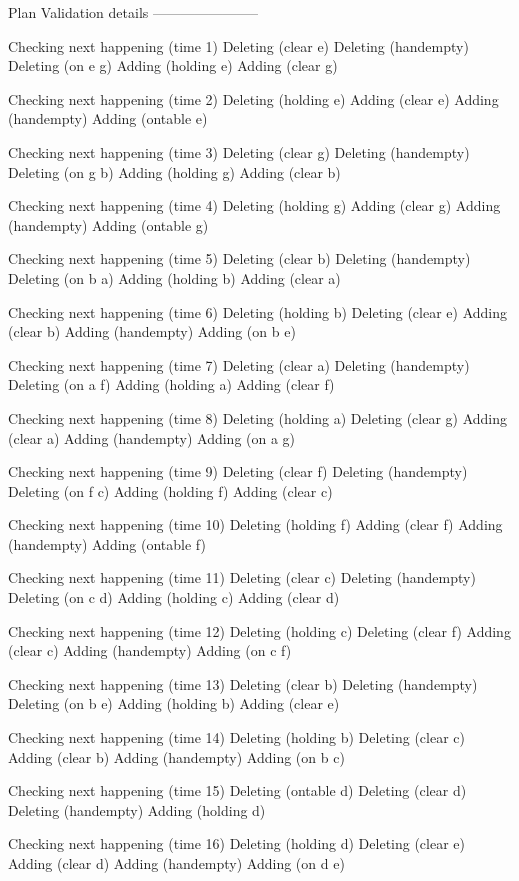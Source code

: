 Plan Validation details
-----------------------

Checking next happening (time 1)
Deleting (clear e)
Deleting (handempty)
Deleting (on e g)
Adding (holding e)
Adding (clear g)

Checking next happening (time 2)
Deleting (holding e)
Adding (clear e)
Adding (handempty)
Adding (ontable e)

Checking next happening (time 3)
Deleting (clear g)
Deleting (handempty)
Deleting (on g b)
Adding (holding g)
Adding (clear b)

Checking next happening (time 4)
Deleting (holding g)
Adding (clear g)
Adding (handempty)
Adding (ontable g)

Checking next happening (time 5)
Deleting (clear b)
Deleting (handempty)
Deleting (on b a)
Adding (holding b)
Adding (clear a)

Checking next happening (time 6)
Deleting (holding b)
Deleting (clear e)
Adding (clear b)
Adding (handempty)
Adding (on b e)

Checking next happening (time 7)
Deleting (clear a)
Deleting (handempty)
Deleting (on a f)
Adding (holding a)
Adding (clear f)

Checking next happening (time 8)
Deleting (holding a)
Deleting (clear g)
Adding (clear a)
Adding (handempty)
Adding (on a g)

Checking next happening (time 9)
Deleting (clear f)
Deleting (handempty)
Deleting (on f c)
Adding (holding f)
Adding (clear c)

Checking next happening (time 10)
Deleting (holding f)
Adding (clear f)
Adding (handempty)
Adding (ontable f)

Checking next happening (time 11)
Deleting (clear c)
Deleting (handempty)
Deleting (on c d)
Adding (holding c)
Adding (clear d)

Checking next happening (time 12)
Deleting (holding c)
Deleting (clear f)
Adding (clear c)
Adding (handempty)
Adding (on c f)

Checking next happening (time 13)
Deleting (clear b)
Deleting (handempty)
Deleting (on b e)
Adding (holding b)
Adding (clear e)

Checking next happening (time 14)
Deleting (holding b)
Deleting (clear c)
Adding (clear b)
Adding (handempty)
Adding (on b c)

Checking next happening (time 15)
Deleting (ontable d)
Deleting (clear d)
Deleting (handempty)
Adding (holding d)

Checking next happening (time 16)
Deleting (holding d)
Deleting (clear e)
Adding (clear d)
Adding (handempty)
Adding (on d e)

